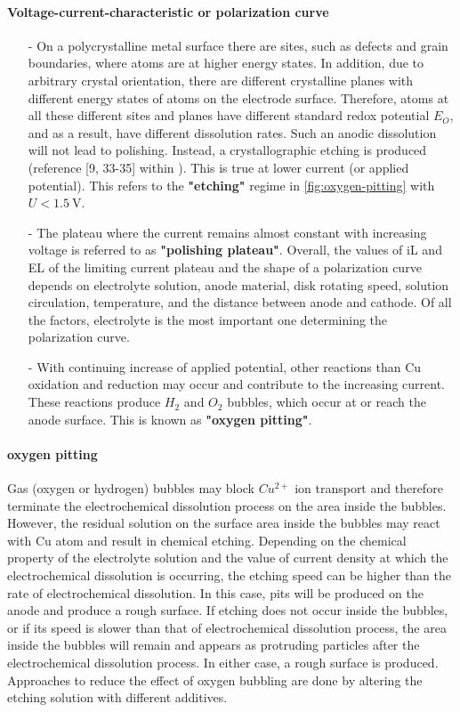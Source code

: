 \paragraph{Voltage-current-characteristic or polarization curve}
\begin{itemize}
	\item[-]On a polycrystalline metal surface there are sites, such as defects and grain boundaries, where atoms are at higher energy states. In addition, due to arbitrary crystal orientation, there are different crystalline planes with different energy states of atoms on the electrode surface. Therefore, atoms at all these different sites and planes have different standard redox potential $E_O$, and as a result, have different dissolution rates.
	Such an anodic dissolution will not lead to polishing. Instead, a crystallographic etching is produced (reference [9, 33-35] within \cite{jinshan_electrochemical_2004}). This is true at lower current (or applied potential). This refers to the \textbf{"etching"} regime in \autoref{fig:oxygen-pitting} with $U<\SI{1.5}{\volt}$.
	\item[-]The plateau where the current remains almost constant with increasing voltage is referred to as \textbf{"polishing plateau"}. Overall, the values of iL and EL of the limiting current plateau and the shape of a polarization curve depends on electrolyte solution, anode material, disk rotating speed, solution circulation, temperature, and the distance between anode and cathode.
	Of all the factors, electrolyte is the most important one determining the polarization curve.
	\item[-]With continuing increase of applied potential, other reactions than Cu oxidation and reduction may occur and contribute to the increasing current. These reactions produce $H_2$ and $O_2$ bubbles, which occur at or reach the anode surface. This is known as \textbf{"oxygen pitting"}.
\end{itemize}

\paragraph{oxygen pitting}
Gas (oxygen or hydrogen) bubbles may block $Cu^{2+}$ ion transport and therefore terminate the electrochemical dissolution process on the area inside the bubbles. However, the residual solution on the surface area inside the bubbles may react with Cu atom and result in chemical etching. Depending on the chemical property of the electrolyte solution and the value of current density at which the electrochemical dissolution is occurring, the etching speed can be higher than the rate of electrochemical dissolution. In this case, pits will be produced on the anode and produce a rough surface. If etching does not occur inside the bubbles, or if its speed is slower than that of electrochemical dissolution process, the area inside the bubbles will remain and appears as protruding particles after the electrochemical dissolution process. In either case, a rough surface is produced. Approaches to reduce the effect of oxygen bubbling are done by altering the etching solution with different additives.

